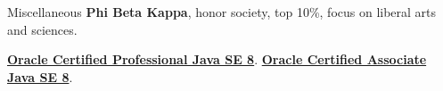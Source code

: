 \begin{rubric}{Miscellaneous}
    \entry*[2018] \textbf{Phi Beta Kappa}, honor society, top 10\%, focus on liberal arts and sciences.

    \entry*[2018] \textbf{\href{https://www.youracclaim.com/badges/c3d44a4e-fabc-4abb-b4fd-2079a364f6bd/public_url}{Oracle Certified Professional Java SE 8}}.
    \entry*[2017] \textbf{\href{https://www.youracclaim.com/badges/fead7b2a-0382-45ea-9566-fb5a39d71972/public_url}{Oracle Certified Associate Java SE 8}}.
\end{rubric}
